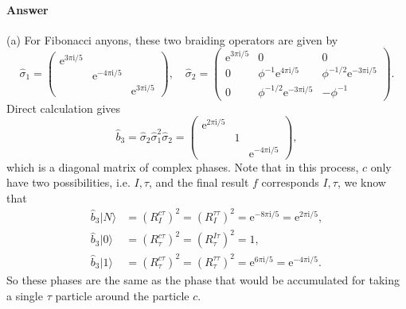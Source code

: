 \documentclass{book}
\begin{document}
\paragraph{Answer}
(a) For Fibonacci anyons, these two braiding operators are given by
\begin{equation*}
\hat{\sigma }_{1} =\begin{pmatrix}
\mathrm{e}^{3\pi \mathrm{i} /5} &  & \\
 & \mathrm{e}^{-4\pi \mathrm{i} /5} & \\
 &  & \mathrm{e}^{3\pi \mathrm{i} /5}
\end{pmatrix} ,\quad \hat{\sigma }_{2} =\begin{pmatrix}
\mathrm{e}^{3\pi \mathrm{i} /5} & 0 & 0\\
0 & \phi ^{-1}\mathrm{e}^{4\pi \mathrm{i} /5} & \phi ^{-1/2}\mathrm{e}^{-3\pi \mathrm{i} /5}\\
0 & \phi ^{-1/2}\mathrm{e}^{-3\pi \mathrm{i} /5} & -\phi ^{-1}
\end{pmatrix} .
\end{equation*}
Direct calculation gives
\begin{equation*}
\hat{b}_{3} =\hat{\sigma }_{2}\hat{\sigma }_{1}^{2}\hat{\sigma }_{2} =\begin{pmatrix}
\mathrm{e}^{2\pi \mathrm{i} /5} &  & \\
 & 1 & \\
 &  & \mathrm{e}^{-4\pi \mathrm{i} /5}
\end{pmatrix} ,
\end{equation*}
which is a diagonal matrix of complex phases. Note that in this process, $c$ only have two possibilities, i.e. $I,\tau $, and the final result $f$ corresponds $I,\tau $, we know that
\begin{equation*}
\begin{aligned}
\hat{b}_{3} |N\rangle  & =(R_{I}^{c\tau } )^{2} =(R_{I}^{\tau \tau } )^{2} =\mathrm{e}^{-8\pi \mathrm{i} /5} =\mathrm{e}^{2\pi \mathrm{i} /5} ,\\
\hat{b}_{3} |0\rangle  & =(R_{\tau }^{c\tau } )^{2} =(R_{\tau }^{I\tau } )^{2} =1,\\
\hat{b}_{3} |1\rangle  & =(R_{\tau }^{c\tau } )^{2} =(R_{\tau }^{\tau \tau } )^{2} =\mathrm{e}^{6\pi \mathrm{i} /5} =\mathrm{e}^{-4\pi \mathrm{i} /5} .
\end{aligned}
\end{equation*}
So these phases are the same as the phase that would be accumulated for taking a single $\tau $ particle around the particle $c$.
\end{document}
